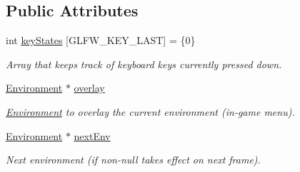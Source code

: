 \subsection*{Public Attributes}
\begin{DoxyCompactItemize}
\item 
int \hyperlink{class_environment_adb416d41b33612a7aeb2cd6a7aa46952}{key\+States} \mbox{[}G\+L\+F\+W\+\_\+\+K\+E\+Y\+\_\+\+L\+A\+ST\mbox{]} = \{0\}\hypertarget{class_environment_adb416d41b33612a7aeb2cd6a7aa46952}{}\label{class_environment_adb416d41b33612a7aeb2cd6a7aa46952}

\begin{DoxyCompactList}\small\item\em Array that keeps track of keyboard keys currently pressed down. \end{DoxyCompactList}\item 
\hyperlink{class_environment}{Environment} $\ast$ \hyperlink{class_environment_abec3f53e89d3967b24e03d81f0763541}{overlay}\hypertarget{class_environment_abec3f53e89d3967b24e03d81f0763541}{}\label{class_environment_abec3f53e89d3967b24e03d81f0763541}

\begin{DoxyCompactList}\small\item\em \hyperlink{class_environment}{Environment} to overlay the current environment (in-\/game menu). \end{DoxyCompactList}\item 
\hyperlink{class_environment}{Environment} $\ast$ \hyperlink{class_environment_a0bad871a3419490df6cbd11168ab9970}{next\+Env}\hypertarget{class_environment_a0bad871a3419490df6cbd11168ab9970}{}\label{class_environment_a0bad871a3419490df6cbd11168ab9970}

\begin{DoxyCompactList}\small\item\em Next environment (if non-\/null takes effect on next frame). \end{DoxyCompactList}\end{DoxyCompactItemize}
